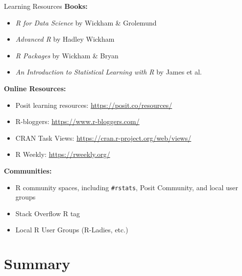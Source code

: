 \documentclass[aspectratio=169]{beamer}
\begin{document}
\begin{frame}{Learning Resources}
  \textbf{Books:}
  \begin{itemize}
    \item \emph{R for Data Science} by Wickham \& Grolemund
    \item \emph{Advanced R} by Hadley Wickham
    \item \emph{R Packages} by Wickham \& Bryan
    \item \emph{An Introduction to Statistical Learning with R} by James et al.
  \end{itemize}

  \textbf{Online Resources:}
  \begin{itemize}
    \item Posit learning resources: \url{https://posit.co/resources/}
    \item R-bloggers: \url{https://www.r-bloggers.com/}
    \item CRAN Task Views: \url{https://cran.r-project.org/web/views/}
    \item R Weekly: \url{https://rweekly.org/}
  \end{itemize}

  \textbf{Communities:}
  \begin{itemize}
    \item R community spaces, including \texttt{\#rstats}, Posit Community, and local user groups
    \item Stack Overflow R tag
    \item Local R User Groups (R-Ladies, etc.)
  \end{itemize}
\end{frame}

\section{Summary}
\end{document}
